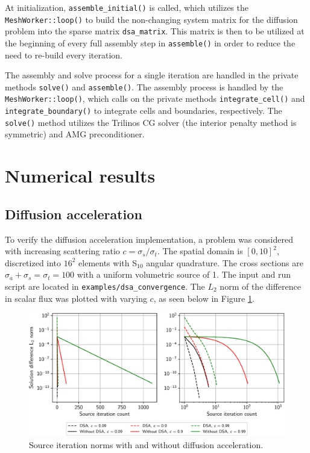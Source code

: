 \documentclass{article}
\begin{document}
At initialization, \texttt{assemble\_initial()} is called, which utilizes the \texttt{MeshWorker::loop()} to build the non-changing system matrix for the diffusion problem into the sparse matrix \texttt{dsa\_matrix}. This matrix is then to be utilized at the beginning of every full assembly step in \texttt{assemble()} in order to reduce the need to re-build every iteration.

The assembly and solve process for a single iteration are handled in the private methods \texttt{solve()} and \texttt{assemble()}. The assembly process is handled by the \texttt{MeshWorker::loop()}, which calls on the private methods \texttt{integrate\_cell()} and \texttt{integrate\_boundary()} to integrate cells and boundaries, respectively. The \texttt{solve()} method utilizes the Trilinos CG solver (the interior penalty method is symmetric) and AMG preconditioner.

\section{Numerical results}

\subsection{Diffusion acceleration}

To verify the diffusion acceleration implementation, a problem was considered with increasing scattering ratio $c = \sigma_s / \sigma_t$. The spatial domain is $[0, 10]^2$, discretized into $16^2$ elements with S$_{10}$ angular quadrature. The cross sections are $\sigma_a + \sigma_s = \sigma_t = 100$ with a uniform volumetric source of 1. The input and run script are located in \texttt{examples/dsa\_convergence}. The $L_2$ norm of the difference in scalar flux was plotted with varying $c$, as seen below in Figure \ref{fig:dsa}.

\begin{figure}[H]
	\centering
	\includegraphics[width=0.9\linewidth]{images/dsa_residuals}
	\caption{Source iteration norms with and without diffusion acceleration.}
	\label{fig:dsa}
\end{figure}
\end{document}
